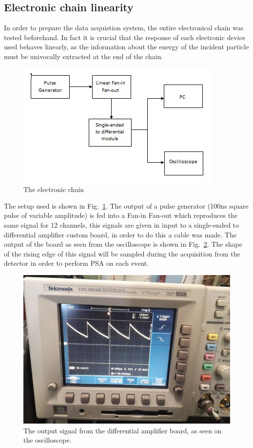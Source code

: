  \subsection{Electronic chain linearity}

In order to prepare the data acquistion system, the entire electronical chain
was tested beforehand. In fact it is crucial that the response of each
electronic device used behaves linearly, as the information about the energy
of the incident particle must be univocally extracted at the end of the chain.

\begin{figure}[h]
  \centering
  \includegraphics[scale=.5]{img/electronic_chain_diagram.JPG}
  \caption{The electronic chain}
  \label{chain}
\end{figure}

The setup used is shown in Fig.~\ref{chain}. The output of a pulse generator (\num{100}ns square pulse of variable amplitude) is fed into a Fan-in Fan-out which reproduces the same signal for 12 channels, this signals are given in input to a single-ended to differential amplifier custom board, in order to do this a cable was made.
The output of the board as seen from the oscilloscope is shown in Fig.~\ref{osc}. The shape of the rising edge of this signal will be sampled during the acquisition from the detector in order to perform PSA on each event.


\begin{figure}[h]
  \centering
  \includegraphics[scale=.35]{img/test_signal_oscilloscope.JPG}
  \caption{The output signal from the differential amplifier board, as seen on the oscilloscope.}
  \label{osc}
\end{figure}

